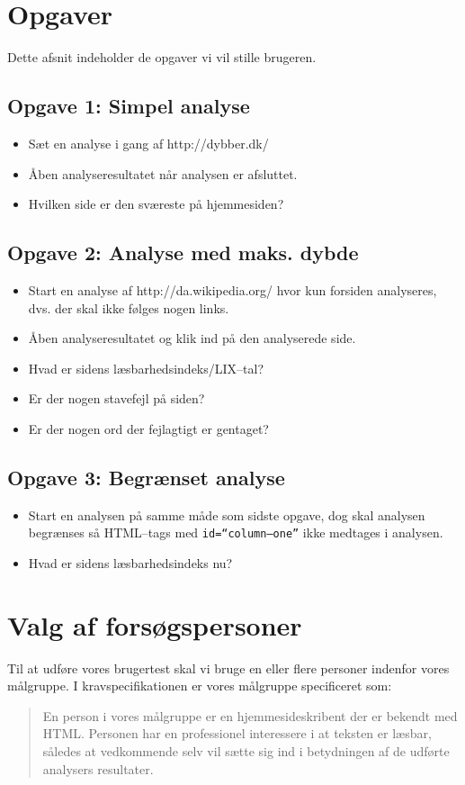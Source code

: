 \documentclass[a4paper,oneside,article]{memoir}
\begin{document}
\section{Opgaver}
Dette afsnit indeholder de opgaver vi vil stille brugeren.

\subsection{Opgave 1: Simpel analyse}
\begin{itemize}
\item Sæt en analyse i gang af http://dybber.dk/
\item Åben analyseresultatet når analysen er afsluttet.
\item Hvilken side er den sværeste på hjemmesiden?
\end{itemize}

\subsection{Opgave 2: Analyse med maks. dybde}
\begin{itemize}
\item Start en analyse af http://da.wikipedia.org/ hvor kun forsiden
  analyseres, dvs. der skal ikke følges nogen links.
\item Åben analyseresultatet og klik ind på den analyserede side.
\item Hvad er sidens læsbarhedsindeks/LIX--tal?
\item Er der nogen stavefejl på siden?
\item Er der nogen ord der fejlagtigt er gentaget?
\end{itemize}

\subsection{Opgave 3: Begrænset analyse}
\begin{itemize}
\item Start en analysen på samme måde som sidste opgave, dog skal
  analysen begrænses så HTML--tags med \texttt{id=``column--one''} ikke
  medtages i analysen.
\item Hvad er sidens læsbarhedsindeks nu?
\end{itemize}
\newpage
\section{Valg af forsøgspersoner}
Til at udføre vores brugertest skal vi bruge en eller flere personer
indenfor vores målgruppe. I kravspecifikationen er vores målgruppe
specificeret som:
\begin{quote}
En person i vores målgruppe er en hjemmesideskribent der er bekendt
med HTML. Personen har en professionel interessere i at teksten er
læsbar, således at vedkommende selv vil sætte sig ind i betydningen af
de udførte analysers resultater.
\end{quote}
\end{document}
